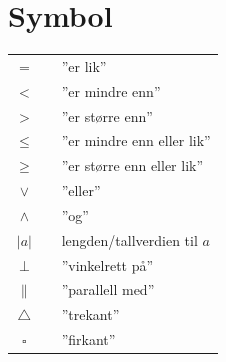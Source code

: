 



\section*{Symbol} \label{Symbol}
\renewcommand{\arraystretch}{1.2}
\begin{tabular}{@{}cp{0.4cm}l}
$ = $ && ''er lik'' \\
$ < $ && ''er mindre enn'' \\
$ > $ && ''er større enn'' \\
$ \leq $ && ''er mindre enn eller lik'' \\
$ \geq $ && ''er større enn eller lik'' \\		
$ \vee $&&''eller''\\
$ \wedge $&&''og''\\
$|a| $ &&  lengden/tallverdien til $ a $\\
$\perp $ &&  ''vinkelrett på'' \\
$\parallel $ &&  ''parallell med'' \\
$\triangle $ &&  ''trekant'' \\
$\square $ &&  ''firkant'' \\
\end{tabular}
\renewcommand{\arraystretch}{1}


